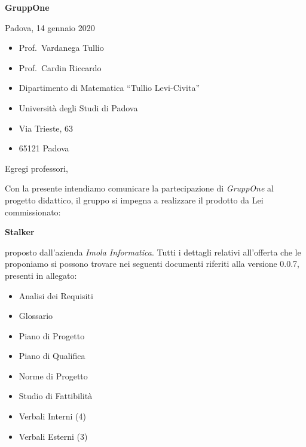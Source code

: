 \documentclass{article}
\begin{document}
\begin{center}
  {\LARGE \textbf{GruppOne}}
\end{center}

\begin{multicols}{2}
  Padova, 14 gennaio 2020
  \columnbreak{}
  \begin{itemize}
    \setlength{\itemsep}{0mm}
    \setlength{\parskip}{0mm}
    \renewcommand{\labelitemi}{}
    \item Prof.\ Vardanega Tullio
    \item Prof.\ Cardin Riccardo
    \item Dipartimento di Matematica ``Tullio Levi-Civita''
    \item Università degli Studi di Padova
    \item Via Trieste, 63
    \item 65121 Padova
  \end{itemize}
\end{multicols}
Egregi professori,

Con la presente intendiamo comunicare la partecipazione di \textit{GruppOne} al progetto didattico, il gruppo si impegna a realizzare il prodotto da Lei commissionato:
\begin{center}
  \textbf{Stalker} 
\end{center}
proposto dall'azienda \textit{Imola Informatica}.
Tutti i dettagli relativi all'offerta che le proponiamo si possono trovare nei seguenti documenti riferiti alla versione 0.0.7, presenti in allegato:
\begin{itemize}
  \item Analisi dei Requisiti
  \item Glossario
  \item Piano di Progetto
  \item Piano di Qualifica
  \item Norme di Progetto
  \item Studio di Fattibilità
  \item Verbali Interni (4)
  \item Verbali Esterni (3)
\end{itemize}
\end{document}
